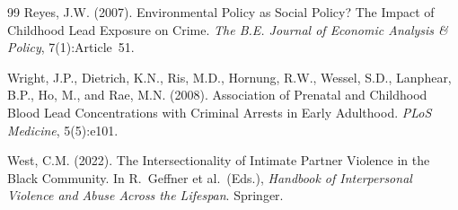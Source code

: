 \documentclass[12pt, letterpaper]{article}
\begin{document}
\begin{thebibliography}{99}
Reyes, J.W. (2007).
\newblock Environmental Policy as Social Policy? The Impact of Childhood Lead Exposure on Crime.
\newblock \textit{The B.E. Journal of Economic Analysis \& Policy}, 7(1):Article~51.

Wright, J.P., Dietrich, K.N., Ris, M.D., Hornung, R.W., Wessel, S.D., Lanphear, B.P., Ho, M., and Rae, M.N. (2008).
\newblock Association of Prenatal and Childhood Blood Lead Concentrations with Criminal Arrests in Early Adulthood.
\newblock \textit{PLoS Medicine}, 5(5):e101.

West, C.M. (2022).
\newblock The Intersectionality of Intimate Partner Violence in the Black Community.
\newblock In R.\ Geffner et al.\ (Eds.), \textit{Handbook of Interpersonal Violence and Abuse Across the Lifespan}. Springer.

\end{thebibliography}
\end{document}
